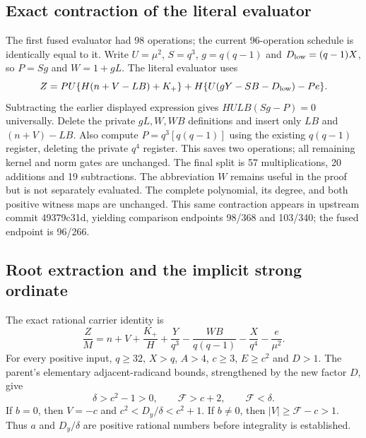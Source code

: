 \subsection{Exact contraction of the literal evaluator}
The first fused evaluator had 98 operations; the current 96-operation
schedule is identically equal to it. Write $U=\mu^2$, $S=q^3$,
$g=q(q-1)$ and $D_{\rm low}=(q-1)X$, so $P=Sg$ and $W=1+gL$.
The literal evaluator uses
\[
 Z=PU\{H(n+V-LB)+K_+\}
       +H\{U(gY-SB-D_{\rm low})-Pe\}.
\]
Subtracting the earlier displayed expression gives
$HULB(Sg-P)=0$ universally. Delete the private $gL,W,WB$ definitions
and insert only $LB$ and $(n+V)-LB$. Also compute
$P=q^3[q(q-1)]$ using the existing $q(q-1)$ register, deleting the
private $q^4$ register. This saves two operations; all remaining kernel
and norm gates are unchanged. The final split is 57 multiplications,
20 additions and 19 subtractions. The abbreviation $W$ remains useful
in the proof but is not separately evaluated. The complete polynomial,
its degree, and both positive witness maps are unchanged. This same
contraction appears in upstream commit 49379c31d, yielding comparison
endpoints 98/368 and 103/340; the fused endpoint is 96/266.

\subsection{Root extraction and the implicit strong ordinate}
The exact rational carrier identity is
\begin{equation}\label{eq:fused-center}
\frac ZM=n+V+\frac{K_+}{H}+\frac Y{q^3}
 -\frac{WB}{q(q-1)}-\frac X{q^4}-\frac e{\mu^2}.
\end{equation}
For every positive input, $q\ge32$, $X>q$, $A>4$, $c\ge3$, $E\ge c^2$
and $D>1$. The parent's elementary adjacent-radicand bounds, strengthened
by the new factor $D$, give
\[
 \delta>c^2-1>0,\qquad \mathcal F>c+2,\qquad \mathcal F<\delta.
\]
If $b=0$, then $V=-c$ and $c^2<D_y/\delta<c^2+1$. If $b\ne0$, then
$|V|\ge\mathcal F-c>1$. Thus $a$ and $D_y/\delta$ are positive
rational numbers before integrality is established.

